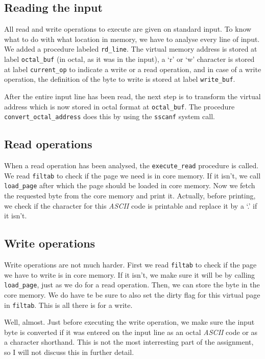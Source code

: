 \documentclass[11pt]{article}
\begin{document}
\subsection{Reading the input}

All read and write operations to execute are given on standard input. To know what to do with what location in memory, we have to analyse every line of input. We added a procedure labeled \verb|rd_line|. The virtual memory address is stored at label \verb|octal_buf| (in octal, as it was in the input), a `r' or `w' character is stored at label \verb|current_op| to indicate a write or a read operation, and in case of a write operation, the definition of the byte to write is stored at label \verb|write_buf|.

After the entire input line has been read, the next step is to transform the virtual address which is now stored in octal format at \verb|octal_buf|. The procedure \verb|convert_octal_address| does this by using the \verb|sscanf| system call.

\subsection{Read operations}

When a read operation has been analysed, the \verb|execute_read| procedure is called. We read \verb|filtab| to check if the page we need is in core memory. If it isn't, we call \verb|load_page| after which the page should be loaded in core memory. Now we fetch the requested byte from the core memory and print it. Actually, before printing, we check if the character for this \emph{ASCII} code is printable and replace it by a `.' if it isn't.

\subsection{Write operations}

Write operations are not much harder. First we read \verb|filtab| to check if the page we have to write is in core memory. If it isn't, we make sure it will be by calling \verb|load_page|, just as we do for a read operation. Then, we can store the byte in the core memory. We do have te be sure to also set the dirty flag for this virtual page in \verb|filtab|. This is all there is for a write.

Well, almost. Just before executing the write operation, we make sure the input byte is converted if it was entered on the input line as an octal \emph{ASCII} code or as a character shorthand. This is not the most interresting part of the assignment, so I will not discuss this in further detail.
\end{document}
